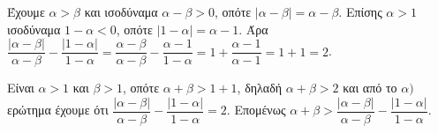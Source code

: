 
\begin{alist}
\item Έχουμε $\alpha > \beta$ και ισοδύναμα $\alpha - \beta > 0$, οπότε $|\alpha - \beta| = \alpha - \beta$.
Επίσης $\alpha > 1$ ισοδύναμα $1 - \alpha < 0$, οπότε $|1 - \alpha| = \alpha - 1$.
Άρα $\dfrac{|\alpha - \beta|}{\alpha - \beta} - \dfrac{|1 - \alpha|}{1 - \alpha} = \dfrac{\alpha - \beta}{\alpha - \beta} - \dfrac{\alpha - 1}{1 - \alpha} = 1 + \dfrac{\alpha - 1}{\alpha - 1} = 1 + 1 = 2$.

\item Είναι $\alpha > 1$ και $\beta > 1$, οπότε $\alpha + \beta > 1 + 1$, δηλαδή $\alpha + \beta > 2$
και από το $\alpha)$ ερώτημα έχουμε ότι $\dfrac{|\alpha - \beta|}{\alpha - \beta} - \dfrac{|1 - \alpha|}{1 - \alpha} = 2$.
Επομένως $\alpha + \beta > \dfrac{|\alpha - \beta|}{\alpha - \beta} - \dfrac{|1 - \alpha|}{1 - \alpha}$.
\end{alist}

